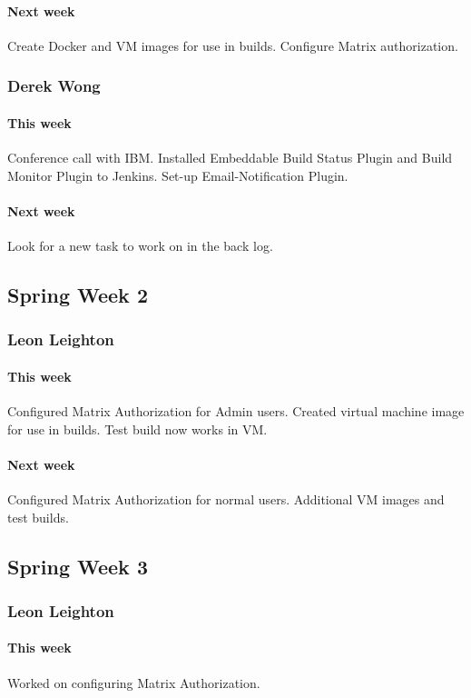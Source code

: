 \documentclass[10pt,letterpaper,onecolumn,draftclsnofoot]{IEEEtran}
\begin{document}
\paragraph{Next week}Create Docker and VM images for use in builds.
Configure Matrix authorization.

\subsubsection{Derek Wong}
\paragraph{This week}Conference call with IBM.     
Installed Embeddable Build Status Plugin and Build Monitor Plugin to Jenkins.   
Set-up Email-Notification Plugin.
\paragraph{Next week}Look for a new task to work on in the back log.

\subsection{Spring Week 2}
\subsubsection{Leon Leighton}
\paragraph{This week}Configured Matrix Authorization for Admin users.    
Created virtual machine image for use in builds. Test build now works in VM.
\paragraph{Next week}Configured Matrix Authorization for normal users.  
Additional VM images and test builds.

\subsection{Spring Week 3}
\subsubsection{Leon Leighton}
\paragraph{This week} Worked on configuring Matrix Authorization. 
\end{document}
